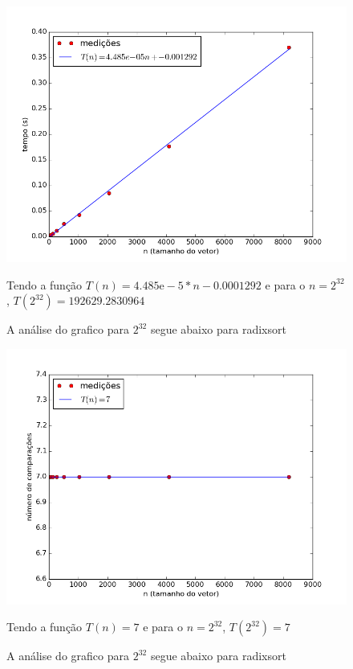 \documentclass[12pt,a4paper,twoside]{report}
\begin{document}


\begin{figure}[ht]
\centering \includegraphics[scale=0.8]{../radixsort/imagens/radixsortQuaseCresc100.png}
\caption{A análise do grafico para $2^{32}$ segue abaixo para radixsort}

Tendo a função $T(n) = 4.485\mathrm{e}-5*n-0.0001292$ e para o $n =2^{32}$, $T(2^{32}) =192629.2830964$
\label{fig:radixsortQuaseCresc100}
\end{figure}

\begin{figure}[ht]
\centering \includegraphics[scale=0.8]{../radixsort/imagens/radixsortQuaseCresc101.png}
\caption{A análise do grafico para $2^{32}$ segue abaixo para radixsort}

Tendo a função $T(n) = 7$ e para o $n =2^{32}$, $T(2^{32}) = 7$
\label{fig:radixsortQuaseCresc101}
\end{figure}
\end{document}
